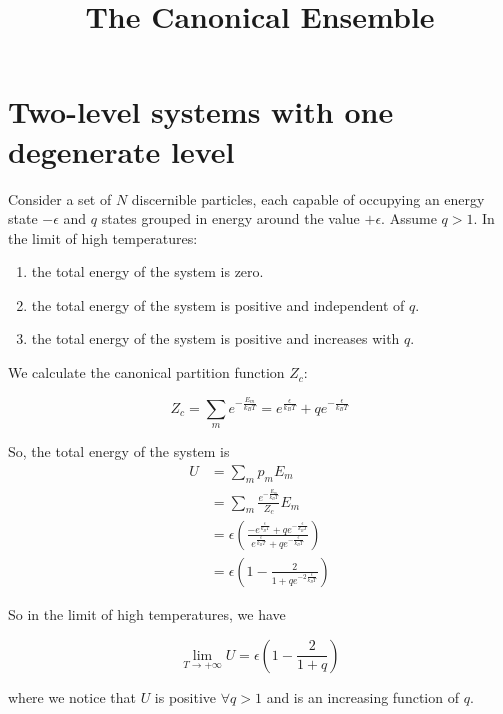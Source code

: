 \documentclass[english]{article}
\begin{document}
	\title{The Canonical Ensemble}
	\author{}
	\date{}
	
	\maketitle
	
	\section{Two-level systems with one degenerate level}
	\begin{tcolorbox}[colback=blue!5!white,colframe=blue!75!black]
		\quad Consider a set of $N$ discernible particles, each capable of occupying an energy state $-\epsilon$ and $q$ states grouped in energy around the value $+\epsilon$. Assume $q > 1$. In the limit of high temperatures:
		\begin{enumerate}
			\item the total energy of the system is zero.
			\item the total energy of the system is positive and independent of $q$.
			\item the total energy of the system is positive and increases with $q$.
		\end{enumerate}
	\end{tcolorbox}

	We calculate the canonical partition function $Z_c$:
	
	$$ Z_c = \sum_{m}e^{-\frac{E_m}{k_B T}} =  e^{\frac{\epsilon}{k_B T}} + q e^{-\frac{\epsilon}{k_B T}} $$
	
	So, the total energy of the system is
	\begin{align}
	U &= \sum_{m} p_m E_m \\
	&= \sum_{m} \frac{e^{-\frac{E_m}{k_B T}}}{Z_c} E_m \\
	&= \epsilon \left(\frac{-e^{\frac{\epsilon}{k_B T}} + qe^{-\frac{\epsilon}{k_B T}}}{e^{\frac{\epsilon}{k_B T}} + q e^{-\frac{\epsilon}{k_B T}}}\right) \\
	&= \epsilon \left(1 - \frac{2}{1+ qe^{-2\frac{\epsilon}{k_B T}}}\right)
	\end{align}
	
	So in the limit of high temperatures, we have
	
	$$ \lim_{T \to +\infty} U = \epsilon \left(1 - \frac{2}{1 + q}\right) $$
	
	where we notice that $U$ is positive $\forall q > 1$ and is an increasing function of $q$.
	
	
\end{document}
